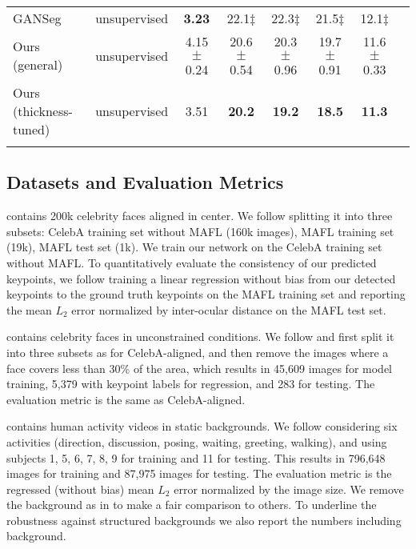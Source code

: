 \documentclass{article}
\begin{document}
\begin{table}[t]
{\begin{tabular}{llcccccc}
GANSeg \cite{he2022ganseg} & unsupervised & \textbf{3.23} & \phantom{$\ddagger$}22.1$\ddagger$ & \phantom{$\ddagger$}22.3$\ddagger$ & \phantom{$\ddagger$}21.5$\ddagger$ & \phantom{$\ddagger$}12.1$\ddagger$\\ 
Ours (general) & unsupervised & 4.15 $\pm$ 0.24 & 20.6 $\pm$ 0.54 & 20.3 $\pm$ 0.96 & 19.7 $\pm$ 0.91 & 11.6 $\pm$ 0.33 \\
Ours (thickness-tuned) & unsupervised & 3.51 & \textbf{20.2} & \textbf{19.2} & \textbf{18.5} &\textbf{11.3} \\ \Xhline{1.5pt}
\end{tabular}
}
\label{tab:cub}
\end{table}












\subsection{Datasets and Evaluation Metrics} \label{sec:datasets}
\noindent{} \cite{liu2015faceattributes} contains 200k celebrity faces aligned in center. We follow \cite{thewlis2017unsupervised} splitting it into three subsets: CelebA training set without MAFL (160k images), MAFL training set (19k), MAFL test set (1k). We train our network on the CelebA training set without MAFL. To quantitatively evaluate the consistency of our predicted keypoints, we follow \cite{thewlis2017unsupervised} training a linear regression without bias from our detected keypoints to the ground truth keypoints on the MAFL training set and reporting the mean $L_2$ error normalized by inter-ocular distance on the MAFL test set.

\noindent{} \cite{liu2015faceattributes} contains celebrity faces in unconstrained conditions. We follow \cite{hung2019scops} and first split it into three subsets as for CelebA-aligned, and then remove the images where a face covers less than 30\% of the area, which results in 45,609 images for model training, 5,379 with keypoint labels for regression, and 283 for testing. The evaluation metric is the same as CelebA-aligned.

\noindent{} \cite{Ionescu2014human36m} contains human activity videos in static backgrounds. We follow \cite{zhang2018unsupervised} considering six activities (direction, discussion, posing, waiting, greeting, walking), and using subjects 1, 5, 6, 7, 8, 9 for training and 11 for testing. This results in 796,648 images for training and 87,975 images for testing. The evaluation metric is the regressed (without bias) mean $L_2$ error normalized by the image size. We remove the background as in \cite{zhang2018unsupervised, lorenz2019unsupervised} to make a fair comparison to others.
To underline the robustness against structured backgrounds we also report the numbers including background.
\end{document}
